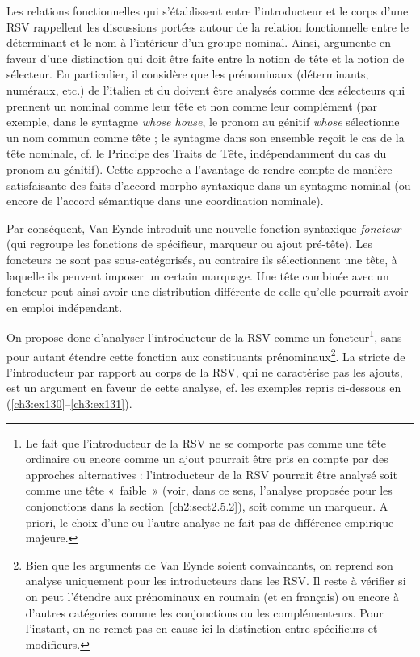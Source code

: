 Les relations fonctionnelles qui s’établissent entre l’introducteur et le corps d’une RSV rappellent les discussions portées autour de la relation fonctionnelle entre le déterminant et le nom à l’intérieur d’un groupe nominal. Ainsi, \citet{VanEynde2003,VanEynde2006,VanEynde2007} argumente en faveur d’une distinction qui doit être faite entre la notion de tête et la notion de sélecteur. En particulier, il considère que les prénominaux (déterminants, numéraux, etc.) de l’italien et du  doivent être analysés comme des sélecteurs qui prennent un nominal comme leur tête et non comme leur complément (par exemple, dans le syntagme \textit{whose house}, le pronom au génitif \textit{whose} sélectionne un nom commun comme tête ; le syntagme dans son ensemble reçoit le cas de la tête nominale, cf. le Principe des Traits de Tête, indépendamment du cas du pronom au génitif). Cette approche a l’avantage de rendre compte de manière satisfaisante des faits d’accord morpho-syntaxique dans un syntagme nominal (ou encore de l’accord sémantique dans une coordination nominale).

Par conséquent, Van Eynde introduit une nouvelle fonction syntaxique \textit{foncteur} (qui regroupe les fonctions de spécifieur, marqueur ou ajout pré-tête). Les foncteurs ne sont pas sous-catégorisés, au contraire ils sélectionnent une tête, à laquelle ils peuvent imposer un certain marquage. Une tête combinée avec un foncteur peut ainsi avoir une distribution différente de celle qu’elle pourrait avoir en emploi indépendant. 

\largerpage
On propose donc d’analyser l’introducteur de la RSV comme un foncteur\footnote{Le fait que l’introducteur de la RSV ne se comporte pas comme une tête ordinaire ou encore comme un ajout pourrait être pris en compte par des approches alternatives : l’introducteur de la RSV pourrait être analysé soit comme une tête «~faible~» (voir, dans ce sens, l’analyse proposée pour les conjonctions dans la section~\ref{ch2:sect2.5.2}), soit comme un marqueur. A priori, le choix d’une ou l’autre analyse ne fait pas de différence empirique majeure.}, sans pour autant étendre cette fonction aux constituants prénominaux\footnote{Bien que les arguments de Van Eynde soient convaincants, on reprend son analyse uniquement pour les introducteurs dans les RSV. Il reste à vérifier si on peut l’étendre aux prénominaux en roumain (et en français) ou encore à d’autres catégories comme les conjonctions ou les complémenteurs. Pour l’instant, on ne remet pas en cause ici la distinction entre spécifieurs et modifieurs.}. La  stricte de l’introducteur par rapport au corps de la RSV, qui ne caractérise pas les ajouts, est un argument en faveur de cette analyse, cf. les exemples repris ci-dessous en (\ref{ch3:ex130}--\ref{ch3:ex131}).

